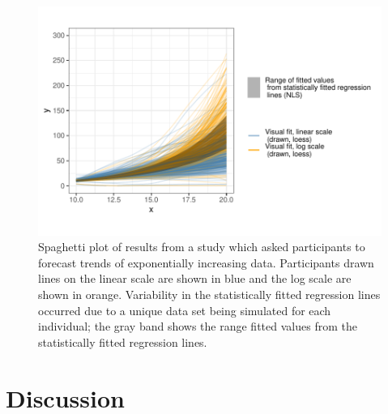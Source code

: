 \documentclass[
]{jds}
\providecommand{\DIFaddbegin}{} %
\newcommand{\DIFaddincludegraphics}[2][]{{\color{blue}\fbox{\DIFOincludegraphics[#1]{#2}}}} %
\DeclareRobustCommand{\DIFaddbegin}{\DIFOaddbegin \let\includegraphics\DIFaddincludegraphics} %
\begin{document}
\begin{figure}

{\centering \includegraphics{./images/fig-exponential-spaghetti-plot-1.pdf}

}

\caption{\label{fig-exponential-spaghetti-plot}Spaghetti plot of results
from a study which asked participants to forecast trends of
exponentially increasing data. Participants drawn lines on the linear
scale are shown in blue and the log scale are shown in orange.
Variability in the statistically fitted regression lines occurred due to
a unique data set being simulated for each individual; the gray band
shows the range fitted values from the statistically fitted regression
lines.}

\end{figure}

\DIFaddbegin \hypertarget{discussion}{%
\section{Discussion}\label{discussion}}
\end{document}

